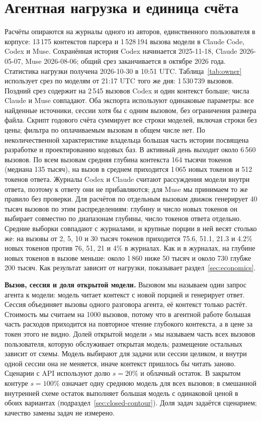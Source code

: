 \section{Агентная нагрузка и единица счёта}
\label{sec:workload}

Расчёты опираются на журналы одного из авторов, единственного пользователя в корпусе: 13\,175 контекстов парсера и 1\,528\,194 вызова
модели в Claude Code, Codex и Muse. Сохранённая история Codex начинается 2025-11-18,
Claude 2026-05-07, Muse 2026-08-06; общий срез заканчивается в октябре 2026 года.
Статистика нагрузки получена 2026-10-30 в 10:51 UTC. Таблица~\ref{tab:owner} использует срез по моделям
от 21:17 UTC того же дня: 1\,530\,739 вызовов. Поздний срез содержит на 2\,545 вызовов Codex и один контекст
больше; числа Claude и Muse совпадают. Оба экспорта используют одинаковые параметры: все найденные источники,
сессии хотя бы с одним вызовом, без ограничения размера файла. Скрипт годового счёта суммирует все строки
моделей, включая строки без цены; фильтра по оплачиваемым вызовам в общем числе нет. По неколичественной характеристике владельца большая часть истории посвящена разработке и проектированию
кодовых баз. В активный день выходит около
6\,560 вызовов. По всем вызовам средняя глубина контекста 164 тысячи токенов (медиана 135 тысяч), на вызов в среднем приходится 1\,065 новых токенов и 512 токенов ответа. Журналы Codex и Claude считают рассуждения модели внутри ответа, поэтому к ответу они не прибавляются; для Muse мы принимаем то же правило без проверки.
Для расчётов по отдельным вызовам движок генерирует 40 тысяч вызовов по этим распределениям: глубину и число новых
токенов он выбирает совместно по диапазонам глубины, число токенов ответа отдельно. Средние выборки совпадают
с журналами, и крупные порции в ней весят столько же: на вызовы от 2, 5, 10 и 30 тысяч токенов приходится 75.6, 51.1,
21.3 и 4.2\% новых токенов против 76, 51, 21 и 4\% в журналах. Как и в журналах, на глубине новых токенов в вызове
меньше: около 1\,860 ниже 50 тысяч и около 730 глубже 200 тысяч. Как результат зависит от нагрузки,
показывает раздел~\ref{sec:economics}.

\textbf{Вызов, сессия и доля открытой модели.} Вызовом мы называем один запрос агента к модели: модель читает контекст
с новой порцией и генерирует ответ. Сессия объединяет вызовы одного разговора агента, её контекст только растёт.
Стоимость мы считаем на 1000 вызовов, потому что в агентной работе большая часть расходов приходится на повторное
чтение глубокого контекста, а в цене за токен этого не видно. Долей открытой модели $s$ мы называем часть всех вызовов
пользователя, которую обслуживает открытая модель; размещение остальных зависит от схемы. Модель
выбирают для задачи или сессии целиком, и внутри одной сессии она не меняется, иначе контекст пришлось бы читать
заново. Сценарии с API используют долю $s=20\%$ и облачный остаток.
В закрытом контуре $s=100\%$ означает одну среднюю модель для всех вызовов;
в смешанной внутренней схеме остаток выполняет большая модель с одинаковой ценой в обоих вариантах
(подраздел~\ref{sec:closed-contour}). Доля задач задаётся сценарием; качество замены задач не измерено.

